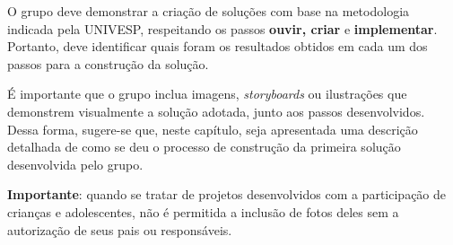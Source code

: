 O grupo deve demonstrar a criação de soluções com base na metodologia
indicada pela UNIVESP, respeitando os passos \textbf{ouvir, criar} e
\textbf{implementar}. Portanto, deve identificar quais foram os resultados
obtidos em cada um dos passos para a construção da solução.

É importante que o grupo inclua imagens, \textit{storyboards} ou
ilustrações que demonstrem visualmente a solução adotada, junto aos passos
desenvolvidos. Dessa forma, sugere-se que, neste capítulo, seja apresentada
uma descrição detalhada de como se deu o processo de construção da primeira
solução desenvolvida pelo grupo.

\textbf{Importante}: quando se tratar de projetos desenvolvidos com a
participação de crianças e adolescentes, não é permitida a inclusão de fotos
deles sem a autorização de seus pais ou responsáveis.
